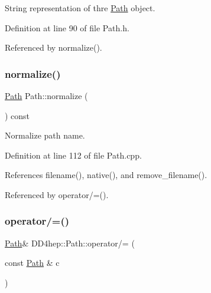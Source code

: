 String representation of thre \hyperlink{class_d_d4hep_1_1_path}{Path} object. 



Definition at line 90 of file Path.\+h.



Referenced by normalize().

\hypertarget{class_d_d4hep_1_1_path_a5cf2746d46d1ed329e5deed868c904de}{}\label{class_d_d4hep_1_1_path_a5cf2746d46d1ed329e5deed868c904de} 
\subsubsection{\texorpdfstring{normalize()}{normalize()}}
{\footnotesize\ttfamily \hyperlink{class_d_d4hep_1_1_path}{Path} Path\+::normalize (\begin{DoxyParamCaption}{ }\end{DoxyParamCaption}) const}



Normalize path name. 



Definition at line 112 of file Path.\+cpp.



References filename(), native(), and remove\+\_\+filename().



Referenced by operator/=().

\hypertarget{class_d_d4hep_1_1_path_aeaa34e8637a1d259e32e28691f6baef6}{}\label{class_d_d4hep_1_1_path_aeaa34e8637a1d259e32e28691f6baef6} 
\subsubsection{\texorpdfstring{operator/=()}{operator/=()}\hspace{0.1cm}{\footnotesize\ttfamily [1/2]}}
{\footnotesize\ttfamily \hyperlink{class_d_d4hep_1_1_path}{Path}\& D\+D4hep\+::\+Path\+::operator/= (\begin{DoxyParamCaption}\item[{const \hyperlink{class_d_d4hep_1_1_path}{Path} \&}]{c }\end{DoxyParamCaption})\hspace{0.3cm}{\ttfamily [inline]}}




